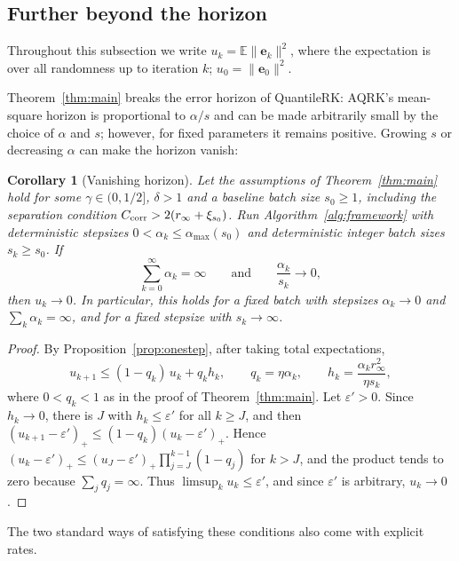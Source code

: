 \documentclass[pdflatex,sn-mathphys-num]{sn-jnl}
\theoremstyle{thmstyleone}
\newtheorem{corollary}{Corollary}
\theoremstyle{thmstylethree}
\newcommand{\ve}{\mathbf{e}}
\begin{document}
\subsection{Further beyond the horizon}
\label{subsec:schedules}
Throughout this subsection we write $u_k=\mathbb E\|\ve_k\|^2$, where the
expectation is over all randomness up to iteration $k$; $u_0=\|\ve_0\|^2$.

Theorem~\ref{thm:main} breaks the error horizon of QuantileRK: AQRK's mean-square horizon is
proportional to $\alpha/s$ and can be made arbitrarily small by the choice of
$\alpha$ and $s$; however, for fixed parameters it remains positive. Growing $s$ or decreasing $\alpha$ can make the horizon vanish:
\begin{corollary}[Vanishing horizon]
\label{cor:vanishing}
Let the assumptions of Theorem~\ref{thm:main} hold for some
$\gamma\in(0,1/2]$, $\delta>1$ and a baseline batch size $s_0\ge1$, including
the separation condition $C_{\rm corr}>2(r_\infty+\xi_{s_0})$. Run
Algorithm~\ref{alg:framework} with deterministic stepsizes
$0<\alpha_k\le\alpha_{\max}(s_0)$ and deterministic integer batch sizes
$s_k\ge s_0$. If
\[
\sum_{k=0}^{\infty}\alpha_k=\infty
\qquad\text{and}\qquad
\frac{\alpha_k}{s_k}\to0,
\]
then $u_k\to0$. In particular, this holds for a fixed batch with stepsizes
$\alpha_k\to0$ and $\sum_k\alpha_k=\infty$, and for a fixed stepsize with
$s_k\to\infty$.
\end{corollary}
\begin{proof}
By Proposition~\ref{prop:onestep}, after taking total expectations,
\[
u_{k+1}\le(1-q_k)\,u_k+q_kh_k,
\qquad
q_k=\eta\alpha_k,
\qquad
h_k=\frac{\alpha_k r_\infty^2}{\eta s_k},
\]
where $0<q_k<1$ as in the proof of Theorem~\ref{thm:main}. Let
$\varepsilon'>0$. Since $h_k\to0$, there is $J$ with $h_k\le\varepsilon'$ for
all $k\ge J$, and then
$(u_{k+1}-\varepsilon')_+\le(1-q_k)(u_k-\varepsilon')_+$. Hence
$(u_k-\varepsilon')_+\le(u_J-\varepsilon')_+\prod_{j=J}^{k-1}(1-q_j)$ for
$k>J$, and the product tends to zero because $\sum_jq_j=\infty$. Thus
$\limsup_k u_k\le\varepsilon'$, and since $\varepsilon'$ is arbitrary,
$u_k\to0$.
\end{proof}

The two standard ways of satisfying these conditions also come with explicit
rates.
\end{document}
